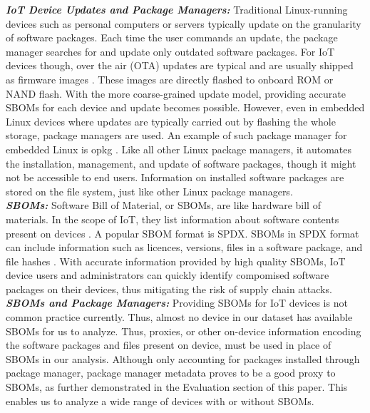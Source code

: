 \textbf{\textit{IoT Device Updates and Package Managers:}} Traditional Linux-running devices such as personal computers or servers typically update on the granularity of software packages. Each time the user commands an update, the package manager searches for and update only outdated software packages. For IoT devices though, over the air (OTA) updates are typical and are usually shipped as firmware images \cite{A_study_of_ota}. These images are directly flashed to onboard ROM or NAND flash. With the more coarse-grained update model, providing accurate SBOMs for each device and update becomes possible. However, even in embedded Linux devices where updates are typically carried out by flashing the whole storage, package managers are used. An example of such package manager for embedded Linux is opkg \cite{opkg}. Like all other Linux package managers, it automates the installation, management, and update of software packages, though it might not be accessible to end users. Information on installed software packages are stored on the file system, just like other Linux package managers. \\
\textbf{\textit{SBOMs:}} Software Bill of Material, or SBOMs, are like hardware bill of materials. In the scope of IoT, they list information about software contents present on devices \cite{What_is_a_sbom}. A popular SBOM format is SPDX. SBOMs in SPDX format can include information such as licences, versions, files in a software package, and file hashes \cite{SPDX_Spec}. With accurate information provided by high quality SBOMs, IoT device users and administrators can quickly identify compomised software packages on their devices, thus mitigating the risk of supply chain attacks. \\
\textbf{\textit{SBOMs and Package Managers:}} Providing SBOMs for IoT devices is not
common practice currently. Thus, almost no device in our dataset has available SBOMs for
us to analyze. Thus, proxies, or other on-device information encoding the
software packages and files present on device, must be used in place of SBOMs
in our analysis. Although only accounting for packages installed through
package manager, package manager metadata proves to be a good proxy to SBOMs, as further demonstrated
in the Evaluation section of this paper. This enables us to analyze a wide
range of devices with or without SBOMs.
